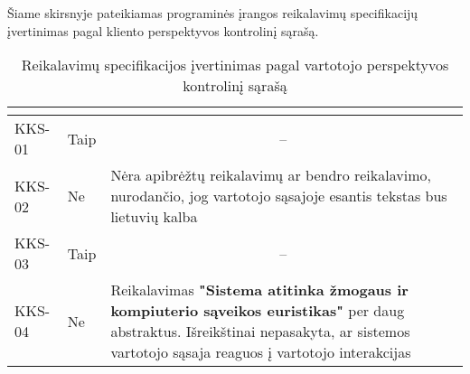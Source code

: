 \documentclass{VUMIFPSkursinis}
\begin{document}
Šiame skirsnyje pateikiamas programinės įrangos reikalavimų specifikacijų įvertinimas pagal kliento perspektyvos kontrolinį sąrašą.
\begin{center}

	\begin{longtable}{|C{2cm}|L{2.5cm}|L{10cm}|}

		\caption{Reikalavimų specifikacijos įvertinimas pagal vartotojo perspektyvos kontrolinį sąrašą}
		\label{table:VKS}

		\\ \hline
		 &
		 &
		\\ \hline
		KKS-01                                          &
		Taip                                            &
		                                                                                                                                                                                                                                                      \\ \hline
		KKS-02                                          &
		Ne                                              &
		Nėra apibrėžtų reikalavimų ar bendro reikalavimo, nurodančio, jog vartotojo sąsajoje esantis tekstas bus lietuvių kalba                                                                                                                                                       \\ \hline
		KKS-03                                          &
		Taip                                            &
		                                                                                                                                                                                                                                                      \\ \hline
		KKS-04                                          &
		Ne                                              &
		Reikalavimas \textbf{"Sistema atitinka žmogaus ir kompiuterio sąveikos euristikas"} per daug abstraktus. Išreikštinai nepasakyta, ar sistemos vartotojo sąsaja reaguos į vartotojo interakcijas                                                                               \\ \hline

\end{longtable}
\end{center}
\end{document}
